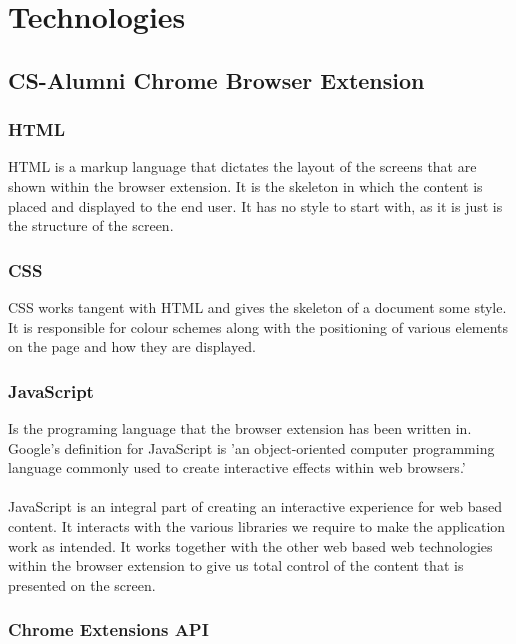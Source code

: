 \documentclass{article}
\begin{document}
\section{Technologies}

\subsection{CS-Alumni Chrome Browser Extension}

\subsubsection{HTML}

HTML is a markup language that dictates the layout of the screens that are shown within the browser extension. It is the skeleton in which the content is placed and displayed to the end user. It has no style to start with, as it is just is the structure of the screen.

\subsubsection{CSS}

CSS works tangent with HTML and gives the skeleton of a document some style. It is responsible for colour schemes along with the positioning of various elements on the page and how they are displayed.

\subsubsection{JavaScript}

Is the programing language that the browser extension has been written in. Google's definition for JavaScript is 'an object-oriented computer programming language commonly used to create interactive effects within web browsers.'\\
\\
JavaScript is an integral part of creating an interactive experience for web based content. It interacts with the various libraries we require to make the application work as intended. It works together with the other web based web technologies within the browser extension to give us total control of the content that is presented on the screen.

\subsubsection{Chrome Extensions API}
\end{document}
